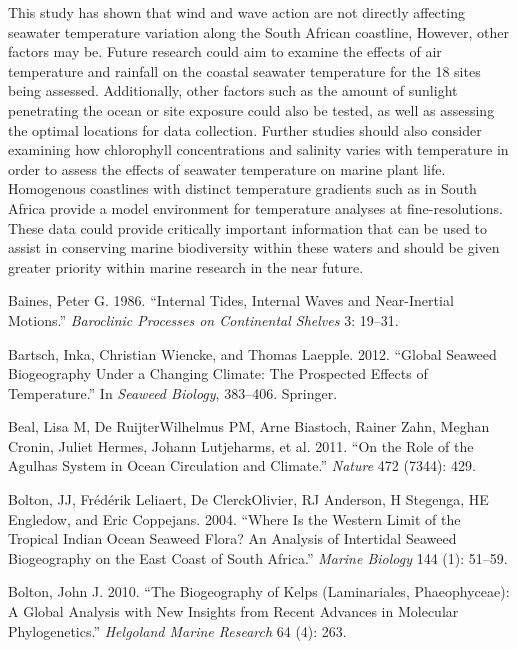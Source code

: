\documentclass[12pt,a4paper,]{article}
\begin{document}
This study has shown that wind and wave action are not directly
affecting seawater temperature variation along the South African
coastline, However, other factors may be. Future research could aim to
examine the effects of air temperature and rainfall on the coastal
seawater temperature for the 18 sites being assessed. Additionally,
other factors such as the amount of sunlight penetrating the ocean or
site exposure could also be tested, as well as assessing the optimal
locations for data collection. Further studies should also consider
examining how chlorophyll concentrations and salinity varies with
temperature in order to assess the effects of seawater temperature on
marine plant life. Homogenous coastlines with distinct temperature
gradients such as in South Africa provide a model environment for
temperature analyses at fine-resolutions. These data could provide
critically important information that can be used to assist in
conserving marine biodiversity within these waters and should be given
greater priority within marine research in the near future.

\hypertarget{refs}{}
\leavevmode\hypertarget{ref-Baines1986}{}%
Baines, Peter G. 1986. ``Internal Tides, Internal Waves and
Near-Inertial Motions.'' \emph{Baroclinic Processes on Continental
Shelves} 3: 19--31.

\leavevmode\hypertarget{ref-Bartsch2012}{}%
Bartsch, Inka, Christian Wiencke, and Thomas Laepple. 2012. ``Global
Seaweed Biogeography Under a Changing Climate: The Prospected Effects of
Temperature.'' In \emph{Seaweed Biology}, 383--406. Springer.

\leavevmode\hypertarget{ref-Beal2011}{}%
Beal, Lisa M, De RuijterWilhelmus PM, Arne Biastoch, Rainer Zahn, Meghan
Cronin, Juliet Hermes, Johann Lutjeharms, et al. 2011. ``On the Role of
the Agulhas System in Ocean Circulation and Climate.'' \emph{Nature} 472
(7344): 429.

\leavevmode\hypertarget{ref-Bolton2004}{}%
Bolton, JJ, Frédérik Leliaert, De ClerckOlivier, RJ Anderson, H
Stegenga, HE Engledow, and Eric Coppejans. 2004. ``Where Is the Western
Limit of the Tropical Indian Ocean Seaweed Flora? An Analysis of
Intertidal Seaweed Biogeography on the East Coast of South Africa.''
\emph{Marine Biology} 144 (1): 51--59.

\leavevmode\hypertarget{ref-Bolton2010}{}%
Bolton, John J. 2010. ``The Biogeography of Kelps (Laminariales,
Phaeophyceae): A Global Analysis with New Insights from Recent Advances
in Molecular Phylogenetics.'' \emph{Helgoland Marine Research} 64 (4):
263.
\end{document}
